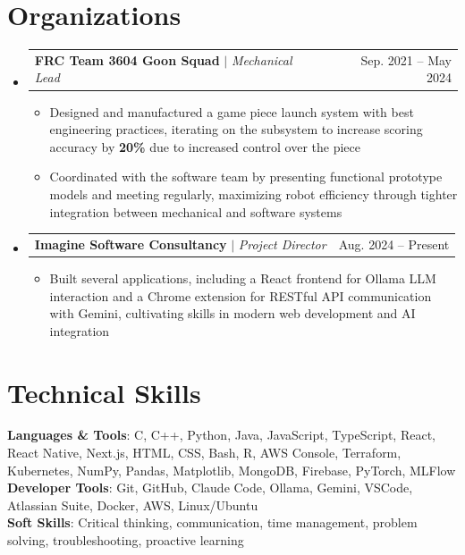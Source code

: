 \documentclass[letterpaper,11pt]{article}
\makeatletter
\newcommand{\resumeItem}[1]{
  \item\small{
    {#1 \vspace{-4pt}}
  }
}
\newcommand{\resumeProjectHeading}[2]{
    \item
    \begin{tabular*}{0.97\textwidth}{l@{\extracolsep{\fill}}r}
      \small#1 & #2 \\
    \end{tabular*}\vspace{-7pt}
}
\newcommand{\resumeSubHeadingListStart}{\begin{itemize}[leftmargin=0.15in, label={}]}
\newcommand{\resumeSubHeadingListEnd}{\end{itemize}}
\newcommand{\resumeItemListStart}{\begin{itemize}}
\newcommand{\resumeItemListEnd}{\end{itemize}\vspace{-5pt}}
\makeatother
\begin{document}
\section{Organizations}
  \resumeSubHeadingListStart

    \resumeProjectHeading
      {\textbf{FRC Team 3604 Goon Squad} $|$ \emph{Mechanical Lead}}{Sep. 2021 -- May 2024}
      \resumeItemListStart
        \resumeItem{Designed and manufactured a game piece launch system with best engineering practices, iterating on the subsystem to increase scoring accuracy by \textbf{20\%} due to increased control over the piece}
        \resumeItem{Coordinated with the software team by presenting functional prototype models and meeting regularly, maximizing robot efficiency through tighter integration between mechanical and software systems}
      \resumeItemListEnd

    \resumeProjectHeading
      {\textbf{Imagine Software Consultancy} $|$ \emph{Project Director}}{Aug. 2024 -- Present}
      \resumeItemListStart
        \resumeItem{Built several applications, including a React frontend for Ollama LLM interaction and a Chrome extension for RESTful API communication with Gemini, cultivating skills in modern web development and AI integration}
      \resumeItemListEnd

 \resumeSubHeadingListEnd
 
%
\section{Technical Skills}
 \begin{itemize}[leftmargin=0.15in, label={}]
    \small{\item{
     \textbf{Languages \& Tools}{: C, C++, Python, Java, JavaScript, TypeScript, React, React Native, Next.js, HTML, CSS, Bash, R, AWS Console, Terraform, Kubernetes, NumPy, Pandas, Matplotlib, MongoDB, Firebase, PyTorch, MLFlow} \\
     \textbf{Developer Tools}{: Git, GitHub, Claude Code, Ollama, Gemini, VSCode, Atlassian Suite, Docker, AWS, Linux/Ubuntu} \\
     \textbf{Soft Skills}{: Critical thinking, communication, time management, problem solving, troubleshooting, proactive learning} \\
    }}
 \end{itemize}


\end{document}
